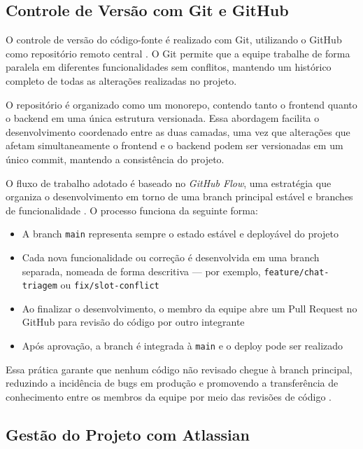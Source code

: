 \subsection{Controle de Versão com Git e GitHub}
\label{subsec:version-control}

O controle de versão do código-fonte é realizado com
Git, utilizando o GitHub como repositório remoto
central \cite{chacon2014}. O Git permite que a equipe
trabalhe de forma paralela em diferentes funcionalidades
sem conflitos, mantendo um histórico completo de todas
as alterações realizadas no projeto.

O repositório é organizado como um monorepo, contendo
tanto o frontend quanto o backend em uma única estrutura
versionada. Essa abordagem facilita o desenvolvimento
coordenado entre as duas camadas, uma vez que alterações
que afetam simultaneamente o frontend e o backend podem
ser versionadas em um único commit, mantendo a
consistência do projeto.

O fluxo de trabalho adotado é baseado no
\textit{GitHub Flow}, uma estratégia que organiza o
desenvolvimento em torno de uma branch principal estável
e branches de funcionalidade \cite{chacon2014}. O
processo funciona da seguinte forma:

\begin{itemize}
  \item A branch \texttt{main} representa sempre o
        estado estável e deployável do projeto
  \item Cada nova funcionalidade ou correção é
        desenvolvida em uma branch separada, nomeada
        de forma descritiva — por exemplo,
        \texttt{feature/chat-triagem} ou
        \texttt{fix/slot-conflict}
  \item Ao finalizar o desenvolvimento, o membro da
        equipe abre um Pull Request no GitHub para
        revisão do código por outro integrante
  \item Após aprovação, a branch é integrada à
        \texttt{main} e o deploy pode ser realizado
\end{itemize}

Essa prática garante que nenhum código não revisado
chegue à branch principal, reduzindo a incidência de
bugs em produção e promovendo a transferência de
conhecimento entre os membros da equipe por meio das
revisões de código \cite{chacon2014}.

\subsection{Gestão do Projeto com Atlassian}
\label{subsec:atlassian}

